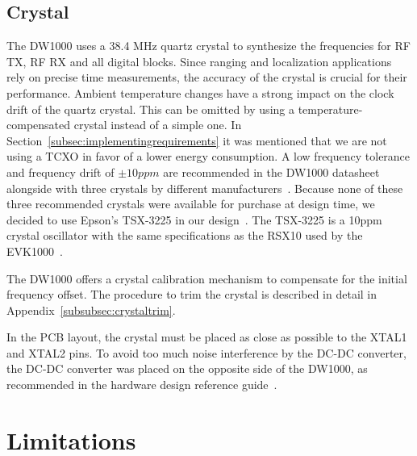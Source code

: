 \documentclass[journal,comsoc]{IEEEtran}
\begin{document}
\subsection{Crystal}
\label{subsec:crystaldesign}
The DW1000 uses a 38.4 MHz quartz crystal to synthesize the frequencies for RF TX, RF RX and all digital blocks. 
Since ranging and localization applications rely on precise time measurements, the accuracy of the crystal is crucial for their performance.
Ambient temperature changes have a strong impact on the clock drift of the quartz crystal.
This can be omitted by using a temperature-compensated crystal instead of a simple one.
In Section~\ref{subsec:implementingrequirements} it was mentioned that we are not using a TCXO in favor of a lower energy consumption. 
A low frequency tolerance and frequency drift of $\pm 10ppm$ are recommended in the DW1000 datasheet alongside with three crystals by different manufacturers~\cite{dw1000ds}.
Because none of these three recommended crystals were available for purchase at design time, we decided to use Epson's TSX-3225 in our design~\cite{crystalds}.
The TSX-3225 is a 10ppm crystal oscillator with the same specifications as the RSX10 used by the EVK1000~\cite{evk1000um}.

The DW1000 offers a crystal calibration mechanism to compensate for the initial frequency offset.
The procedure to trim the crystal is described in detail in Appendix~\ref{subsubsec:crystaltrim}.

In the PCB layout, the crystal must be placed as close as possible to the XTAL1 and XTAL2 pins.
To avoid too much noise interference by the DC-DC converter, the DC-DC converter was placed on the opposite side of the DW1000, as recommended in the hardware design reference guide~\cite{dw1000hwdesignguide}.


\section{Limitations}
\label{sec:limitations}
\end{document}
